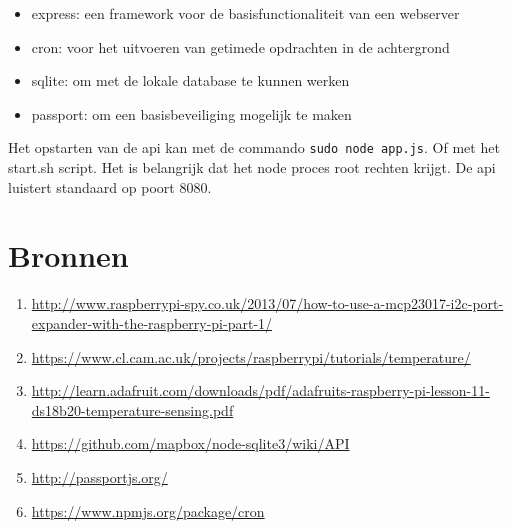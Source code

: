 \documentclass[a4paper,12pt]{article}
\begin{document}
\begin{itemize}
 \item express: een framework voor de basisfunctionaliteit van een webserver
 \item cron: voor het uitvoeren van getimede opdrachten in de achtergrond
 \item sqlite: om met de lokale database te kunnen werken
 \item passport: om een basisbeveiliging mogelijk te maken
\end{itemize}
\noindent
Het opstarten van de api kan met de commando \texttt{sudo node app.js}. Of met het start.sh script. Het is belangrijk dat het node proces root rechten krijgt. De api luistert standaard op poort 8080.


\newpage

\section{Bronnen}

\begin{enumerate}
\item \url{http://www.raspberrypi-spy.co.uk/2013/07/how-to-use-a-mcp23017-i2c-port-expander-with-the-raspberry-pi-part-1/}
\item \url{https://www.cl.cam.ac.uk/projects/raspberrypi/tutorials/temperature/}
\item \url{http://learn.adafruit.com/downloads/pdf/adafruits-raspberry-pi-lesson-11-ds18b20-temperature-sensing.pdf}
\item \url{https://github.com/mapbox/node-sqlite3/wiki/API}
\item \url{http://passportjs.org/}
\item \url{https://www.npmjs.org/package/cron}

\end{enumerate}
\end{document}
